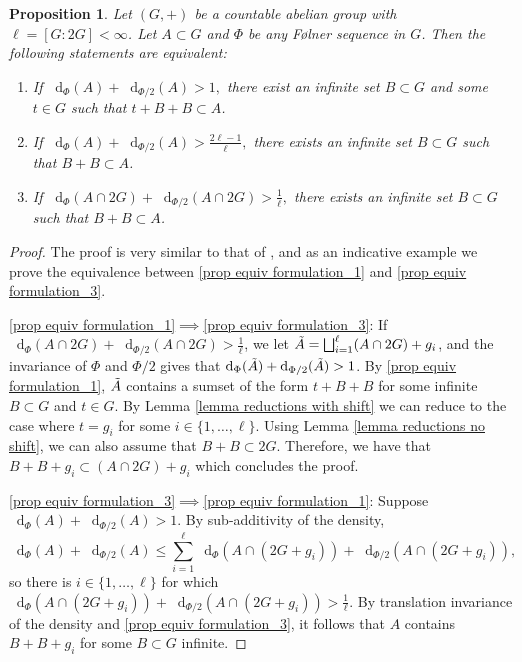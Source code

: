\documentclass[reqno]{amsart}
\newcommand*\diff{\mathop{}\!\mathrm{d}}
\newtheorem{proposition}[theorem]{Proposition}
\theoremstyle{definition}
\theoremstyle{remark}
\theoremstyle{remark}
\newcommand{\Folner}{F\o{}lner}
\begin{document}
\begin{proposition} \label{prop equiv formulation}
    Let $(G,+)$ be a countable abelian group with $\ell=[G:2G]<\infty$. Let $A\subset G$ and $\Phi$ be any \Folner{} sequence in $G$. Then the following statements are equivalent:
\begin{enumerate}
\item  \label{prop equiv formulation_1}
If 
$\diff_\Phi(A)+ \diff_{\Phi/2}(A)> 1,$
there exist an infinite set $B\subset G$ and some $t\in G$ such that 
$t+B+B\subset A$. 
\item  \label{prop equiv formulation_2} 
\vspace{2mm} 
If 
$\diff_\Phi(A) + \diff_{\Phi/2}(A)> \frac{2\ell-1}{\ell},$
there exists an infinite set $B\subset G$ such that $B+B\subset A$. 
\item   \label{prop equiv formulation_3}  \vspace{2mm} If 
$\diff_\Phi(A\cap 2G)+\diff_{\Phi/2}(A\cap 2G) > \frac{1}{\ell},$
there exists an infinite set $B\subset G$ such that $B+B\subset A$.
\end{enumerate} 
\end{proposition}

\begin{proof}
The proof is very similar to that of \cite[Proposition 2.3]{charamaras_kousek_mountakis_radic2025BBingroups}, and as an indicative example we prove the equivalence between \eqref{prop equiv formulation_1} and \eqref{prop equiv formulation_3}.

\eqref{prop equiv formulation_1}$\implies$\eqref{prop equiv formulation_3}: If $\diff_{ \Phi}(A \cap 2G )+\diff_{ \Phi/2}(A \cap 2G ) > \frac{1}{\ell}$, we let $\Tilde{A} = \bigsqcup_{i=1}^{\ell} (A \cap 2G) + g_i$, and the invariance of $\Phi$ and $\Phi/2$ gives that $\diff_{ \Phi}(\Tilde{A} )+\diff_{ \Phi/2}(\Tilde{A} ) > 1$. By \eqref{prop equiv formulation_1}, $\Tilde{A}$ contains a sumset of the form $t+B+B$ for some infinite $ B \subset G$ and $t \in G$.
    By Lemma \ref{lemma reductions with shift} we can reduce to the case where $t= g_i$ for some $i \in \{1, \ldots, \ell\}$. Using 
    Lemma \ref{lemma reductions no shift}, we can also assume that $B+B \subset 2G$. Therefore, we have that $B+B+ g_i \subset (A \cap 2G) + g_i$ which concludes the proof.

    \eqref{prop equiv formulation_3}$\implies$\eqref{prop equiv formulation_1}: Suppose $\diff_{ \Phi}(A )+\diff_{ \Phi/2}(A) > 1$. By sub-additivity of the density, 
$$\diff_{ \Phi}(A)+\diff_{ \Phi/2}(A) \leq \sum_{i=1}^{\ell} \diff_{ \Phi}(A \cap (2G + g_i) )+\diff_{ \Phi/2}(A \cap (2G + g_i) ), $$ so there is $i \in \{1, \ldots, \ell\}$ for which     
    $\diff_{ \Phi}(A \cap (2G + g_i) )+\diff_{ \Phi/2}(A \cap (2G + g_i) )  >\frac{1}{\ell}$. 
    By translation invariance
    of the density and \eqref{prop equiv formulation_3}, it follows that $A$ contains $B+B+g_i$ for some $ B \subset G$ infinite.  
\end{proof}
\end{document}
